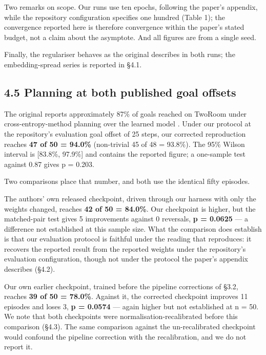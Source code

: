 \documentclass[10pt]{article}
\begin{document}
Two remarks on scope. Our runs use ten epochs, following the paper's appendix,
while the repository configuration specifies one hundred (Table 1); the
convergence reported here is therefore convergence within the paper's stated
budget, not a claim about the asymptote. And all figures are from a single seed.

Finally, the regulariser behaves as the original describes in both runs; the
embedding-spread series is reported in \S{}4.1.

\subsection{4.5 Planning at both published goal offsets}\label{planning-at-both-published-goal-offsets}

The original reports approximately 87\% of goals reached on TwoRoom under
cross-entropy-method planning over the learned model \citep[Fig.~6]{maes2026lewm}. Under our
protocol at the repository's evaluation goal offset of 25 steps, our corrected
reproduction reaches \textbf{47 of 50 = 94.0\%} (non-trivial 45 of 48 = 93.8\%). The
95\% Wilson interval is {[}83.8\%, 97.9\%{]} and contains the reported figure; a
one-sample test against 0.87 gives p = 0.203.

Two comparisons place that number, and both use the identical fifty episodes.

The authors' own released checkpoint, driven through our harness with only the
weights changed, reaches \textbf{42 of 50 = 84.0\%}. Our checkpoint is higher, but the
matched-pair test gives 5 improvements against 0 reversals, \textbf{p = 0.0625} --- a
difference not established at this sample size. What the comparison does establish is that our evaluation protocol is faithful
under the reading that reproduces: it recovers the reported result from the
reported weights under the repository's evaluation configuration, though not
under the protocol the paper's appendix describes (\S{}4.2).

Our own earlier checkpoint, trained before the pipeline corrections of \S{}3.2,
reaches \textbf{39 of 50 = 78.0\%}. Against it, the corrected checkpoint improves 11
episodes and loses 3, \textbf{p = 0.0574} --- again higher but not established at
n = 50. We note that both checkpoints were normalisation-recalibrated before this comparison (\S{}4.3). The same comparison against the un-recalibrated checkpoint would confound the pipeline correction with the recalibration, and we do not report it.
\end{document}

